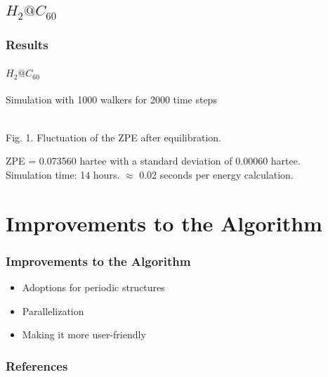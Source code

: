 \documentclass{beamer}
\begin{document}
\subsection{$H_2@C_{60}$}
\begin{frame}
\frametitle{Results}
\framesubtitle{$H_2@C_{60}$}
Simulation with 1000 walkers for 2000 time steps
\begin{center}
\\
Fig. 1. Fluctuation of the ZPE after equilibration.
\end{center}
ZPE = 0.073560 hartee with a standard deviation of 0.00060 hartee.\\
Simulation time: 14 hours. $\approx$ 0.02 seconds per energy calculation.


\end{frame}


\section{Improvements to the Algorithm}
\begin{frame}
\frametitle{Improvements to the Algorithm}
\begin{itemize}
\item Adoptions for periodic structures
\item Parallelization
\item Making it more user-friendly
\end{itemize}
\end{frame}


\begin{frame}
\frametitle{References}

\begin{scriptsize}

\end{scriptsize}
\end{frame}
\end{document}

